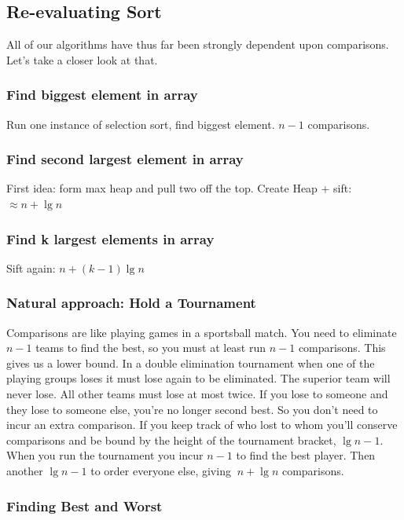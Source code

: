 \documentclass[english, 10pt]{article}
\begin{document}
\subsection{Re-evaluating Sort}
All of our algorithms have thus far been strongly dependent upon comparisons.
Let's take a closer look at that.

\subsubsection{Find biggest element in array}
Run one instance of selection sort, find biggest element. $n-1$ comparisons.

\subsubsection{Find second largest element in array}

First idea: form max heap and pull two off the top. Create Heap + sift: $\approx n + \lg n$

\subsubsection{Find k largest elements in array}

Sift again: $n+ (k-1)\lg n$

\subsubsection{Natural approach: Hold a Tournament}

Comparisons are like playing games in a sportsball match. You need to eliminate
$n-1$ teams to find the best, so you must at least run $n-1$ comparisons.  This
gives us a lower bound. In a double elimination tournament when one of the
playing groups loses it must lose again to be eliminated. The superior team
will never lose. All other teams must lose at most twice. If you lose to
someone and they lose to someone else, you're no longer second best. So you
don't need to incur an extra comparison.  If you keep track of who lost to whom
you'll conserve comparisons and be bound by the height of the tournament
bracket, $\lg n-1$. When you run the tournament you incur $n-1$ to find the best
player. Then another $\lg n -1$ to order everyone else, giving $~n+\lg n$
comparisons.

\subsubsection{Finding Best and Worst}
\end{document}
